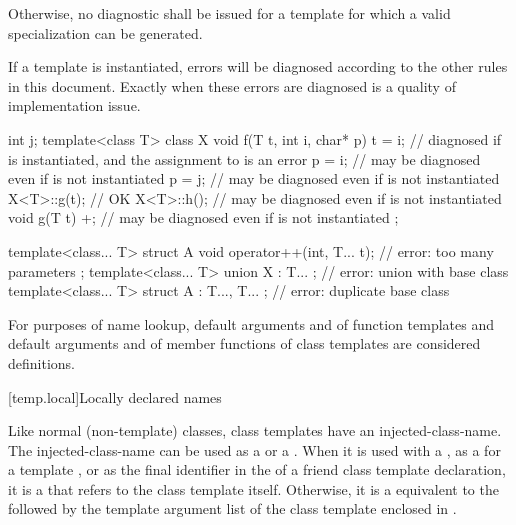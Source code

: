 Otherwise, no diagnostic shall be issued for a template
for which a valid specialization can be generated.
\begin{note}
If a template is instantiated, errors will be diagnosed according
to the other rules in this document.
Exactly when these errors are diagnosed is a quality of implementation issue.
\end{note}
\begin{example}
\begin{codeblock}
int j;
template<class T> class X {
  void f(T t, int i, char* p) {
    t = i;          // diagnosed if  is instantiated, and the assignment to  is an error
    p = i;          // may be diagnosed even if  is not instantiated
    p = j;          // may be diagnosed even if  is not instantiated
    X<T>::g(t);     // OK
    X<T>::h();      // may be diagnosed even if  is not instantiated
  }
  void g(T t) {
    +;              // may be diagnosed even if  is not instantiated
  }
};

template<class... T> struct A {
  void operator++(int, T... t);                     // error: too many parameters
};
template<class... T> union X : T... { };            // error: union with base class
template<class... T> struct A : T...,  T... { };    // error: duplicate base class
\end{codeblock}
\end{example}

\pnum
\begin{note}
For purposes of name lookup, default arguments and
 of function templates and default
arguments and  of
member functions of class templates are considered definitions.
\end{note}

[temp.local]{Locally declared names}

\pnum
Like normal (non-template) classes, class templates have an
injected-class-name.
The
injected-class-name can be used
as a  or a .
When it is used with a
,
as a  for a template ,
or as the final identifier in the  of
a friend class template declaration,
it is a  that refers to the
class template itself.
Otherwise, it is a 
equivalent to the 
followed by
the template argument list
of the class template
enclosed in \tcode{<>}.

